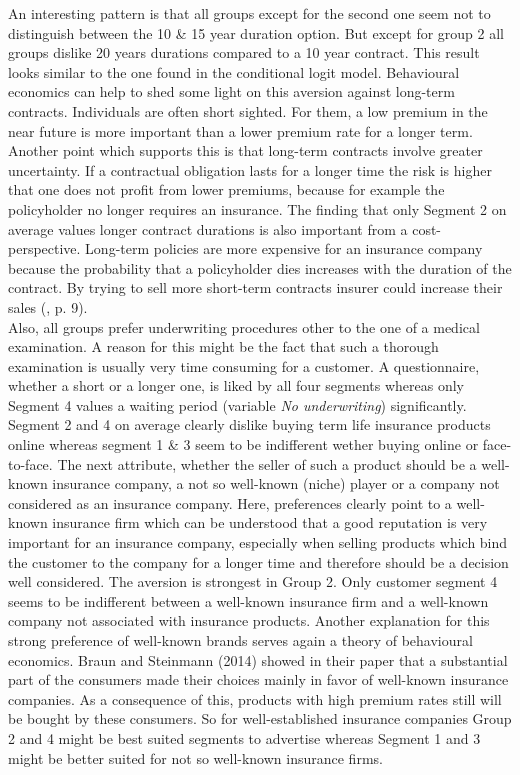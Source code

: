 \documentclass[12pt, abstracton]{article}
\begin{document}
An interesting pattern is that all groups except for the second one seem not to distinguish between the 10 \& 15 year duration option. But except for group 2 all groups dislike 20 years durations compared to a 10 year contract. This result looks similar to the one found in the conditional logit model. Behavioural economics can help to shed some light on this aversion against long-term contracts. Individuals are often short sighted. For them, a low premium in the near future is more important than a lower premium rate for a longer term. Another point which supports this is that long-term contracts involve greater uncertainty. If a contractual obligation lasts for a longer time the risk is higher that one does not profit from lower premiums, because for example the policyholder no longer requires an insurance. The finding that only Segment 2 on average values longer contract durations is also important from a cost-perspective. Long-term policies are more expensive for an insurance company because the probability that a policyholder dies increases with the duration of the contract. By trying to sell more short-term contracts insurer could increase their sales (\cite{Braun2014}, p. 9).\\
Also, all groups prefer underwriting procedures other to the one of a medical examination. A reason for this might be the fact that such a thorough examination is usually very time consuming for a customer. A questionnaire, whether a short or a longer one, is liked by all four segments whereas only Segment 4 values a waiting period (variable \textit{No underwriting}) significantly.\\
Segment 2 and 4 on average clearly dislike buying term life insurance products online whereas segment 1 \& 3 seem to be indifferent wether buying online or face-to-face. The next attribute, whether the seller of such a product should be a well-known insurance company, a not so well-known (niche) player or a company not considered as an insurance company. Here, preferences clearly point to a well-known insurance firm which can be understood that a good reputation is very important for an insurance company, especially when selling products which bind the customer to the company for a longer time and therefore should be a decision well considered. The aversion is strongest in Group 2. Only customer segment 4 seems to be indifferent between a well-known insurance firm and a well-known company not associated with insurance products. Another explanation for this strong preference of well-known brands serves again a theory of behavioural economics. Braun and Steinmann (2014) showed in their paper that a substantial part of the consumers made their choices mainly in favor of well-known insurance companies. As a consequence of this, products with high premium rates still will be bought by these consumers. So for well-established insurance companies Group 2 and 4 might be best suited segments to advertise whereas Segment 1 and 3 might be better suited for not so well-known insurance firms.\\
\end{document}
